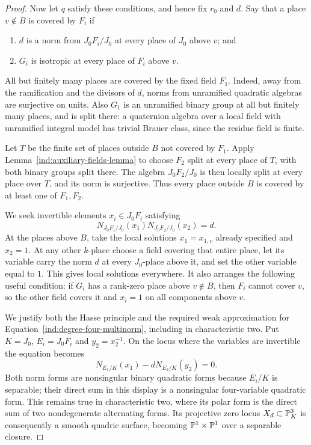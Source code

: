 \begin{proof}
Now let $q$ satisfy these conditions, and hence fix $r_0$ and $d$.
Say that a place $v\notin B$ is covered by $F_i$ if
\begin{enumerate}
\item $d$ is a norm from $J_0F_i/J_0$ at every place of $J_0$
      above $v$; and
\item $G_i$ is isotropic at every place of $F_i$ above $v$.
\end{enumerate}
All but finitely many places are covered by the fixed field $F_1$.
Indeed, away from the ramification and the divisors of $d$, norms
from unramified quadratic algebras are surjective on units.
Also $G_1$ is an unramified binary group at all but finitely many
places, and is split there: a quaternion algebra over a local
field with unramified integral model has trivial Brauer class,
since the residue field is finite.

Let $T$ be the finite set of places outside $B$ not covered by
$F_1$.  Apply Lemma~\ref{ind:auxiliary-fields-lemma} to choose
$F_2$ split at every place of $T$, with both binary groups split
there.  The algebra $J_0F_2/J_0$ is then locally split at every
place over $T$, and its norm is surjective.  Thus every place
outside $B$ is covered by at least one of $F_1,F_2$.

We seek invertible elements $x_i\in J_0F_i$ satisfying
\begin{equation}\label{ind:degree-four-multinorm}
 N_{J_0F_1/J_0}(x_1)N_{J_0F_2/J_0}(x_2)=d.
\end{equation}
At the places above $B$, take the local solutions
$x_1=x_{1,v}$ already specified and $x_2=1$.
At any other $k$-place choose a field covering that entire
place, let its variable carry the norm $d$ at every $J_0$-place
above it, and set the other variable equal to $1$.
This gives local solutions everywhere.
It also arranges the following useful condition: if $G_i$
has a rank-zero place above $v\notin B$, then $F_i$ cannot
cover $v$, so the other field covers it and $x_i=1$ on all
components above $v$.

We justify both the Hasse principle and the required weak
approximation for Equation~\eqref{ind:degree-four-multinorm},
including in characteristic two.  Put $K=J_0$, $E_i=J_0F_i$
and $y_2=x_2^{-1}$.  On the locus where the variables are
invertible the equation becomes
\begin{equation}\label{ind:degree-four-quadric}
 N_{E_1/K}(x_1)-dN_{E_2/K}(y_2)=0.
\end{equation}
Both norm forms are nonsingular binary quadratic forms because
$E_i/K$ is separable; their direct sum in this display is a
nonsingular four-variable quadratic form.  This remains true
in characteristic two, where its polar form is the direct sum
of two nondegenerate alternating forms.  Its projective zero
locus $X_d\subset\mathbb P^3_K$ is consequently a smooth quadric
surface, becoming $\mathbb P^1\times\mathbb P^1$ over a separable
closure.


\end{proof}
